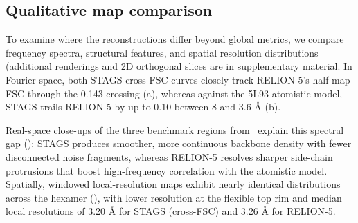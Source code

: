 
\subsection{Qualitative map comparison}
\label{sec:results:visual}
To examine where the reconstructions differ beyond global metrics, we compare frequency spectra, structural features, and spatial resolution distributions (additional renderings and 2D orthogonal slices are in supplementary material.%
In Fourier space, both STAGS cross-FSC curves closely track RELION-5's half-map FSC through the 0.143 crossing (a), whereas against the 5L93 atomistic model, STAGS trails RELION-5 by up to 0.10 between 8 and 3.6 Å (b).

Real-space close-ups of the three benchmark regions from~\cite{burt2024relion5} explain this spectral gap (): STAGS produces smoother, more continuous backbone density with fewer disconnected noise fragments, whereas RELION-5 resolves sharper side-chain protrusions that boost high-frequency correlation with the atomistic model. Spatially, windowed local-resolution maps exhibit nearly identical distributions across the hexamer (), with lower resolution at the flexible top rim and median local resolutions of 3.20 Å for STAGS (cross-FSC) and 3.26 Å for \mbox{RELION-5}.



